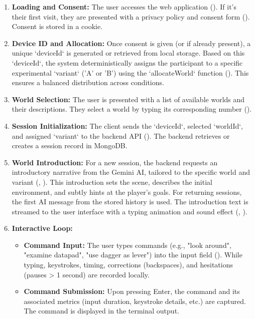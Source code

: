 \documentclass{article}
\begin{document}
\begin{enumerate}
    \item \textbf{Loading and Consent:} The user accesses the web application (). If it's their first visit, they are presented with a privacy policy and consent form (). Consent is stored in a cookie.
    \item \textbf{Device ID and Allocation:} Once consent is given (or if already present), a unique `deviceId` is generated or retrieved from local storage. Based on this `deviceId`, the system deterministically assigns the participant to a specific experimental `variant` ('A' or 'B') using the `allocateWorld` function (). This ensures a balanced distribution across conditions.
    \item \textbf{World Selection:} The user is presented with a list of available worlds and their descriptions. They select a world by typing its corresponding number ().
    \item \textbf{Session Initialization:} The client sends the `deviceId`, selected `worldId`, and assigned `variant` to the backend API (). The backend retrieves or creates a session record in MongoDB.
    \item \textbf{World Introduction:} For a new session, the backend requests an introductory narrative from the Gemini AI, tailored to the specific world and variant (, ). This introduction sets the scene, describes the initial environment, and subtly hints at the player's goals. For returning sessions, the first AI message from the stored history is used. The introduction text is streamed to the user interface with a typing animation and sound effect (, ).
    \item \textbf{Interactive Loop:}
        \begin{itemize}
            \item \textbf{Command Input:} The user types commands (e.g., "look around", "examine datapad", "use dagger as lever") into the input field (). While typing, keystrokes, timing, corrections (backspaces), and hesitations (pauses > 1 second) are recorded locally.
            \item \textbf{Command Submission:} Upon pressing Enter, the command and its associated metrics (input duration, keystroke details, etc.) are captured. The command is displayed in the terminal output.

\end{itemize}
\end{enumerate}
\end{document}
